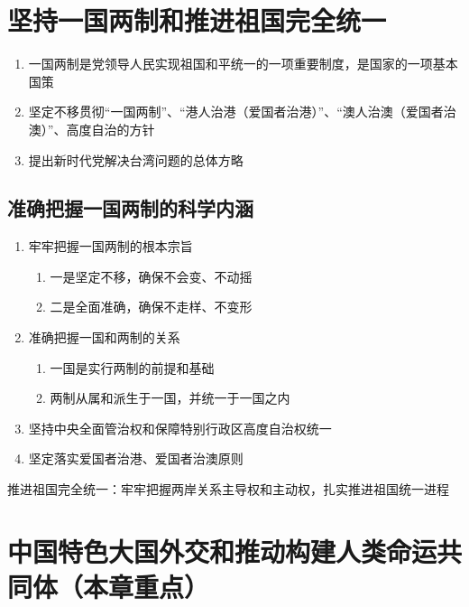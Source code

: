 \documentclass{ctexart}
\numberwithin{figure}{section}
\numberwithin{equation}{section}
\begin{document}
\section{坚持一国两制和推进祖国完全统一}
    \begin{enumerate}
        \item 一国两制是党领导人民实现祖国和平统一的一项重要制度，是国家的一项基本国策
        \item 坚定不移贯彻“一国两制”、“港人治港（爱国者治港）”、“澳人治澳（爱国者治澳）”、高度自治的方针
        \item 提出新时代党解决台湾问题的总体方略
    \end{enumerate}
    \subsection{准确把握一国两制的科学内涵}
    \begin{enumerate}
        \item 牢牢把握一国两制的根本宗旨
        \begin{enumerate}
            \item 一是坚定不移，确保不会变、不动摇
            \item 二是全面准确，确保不走样、不变形
        \end{enumerate}
        \item 准确把握一国和两制的关系
        \begin{enumerate}
            \item 一国是实行两制的前提和基础
            \item 两制从属和派生于一国，并统一于一国之内
        \end{enumerate}
        \item 坚持中央全面管治权和保障特别行政区高度自治权统一
        \item 坚定落实爱国者治港、爱国者治澳原则
    \end{enumerate}
    推进祖国完全统一：牢牢把握两岸关系主导权和主动权，扎实推进祖国统一进程
\section{中国特色大国外交和推动构建人类命运共同体（本章重点）}
\end{document}
